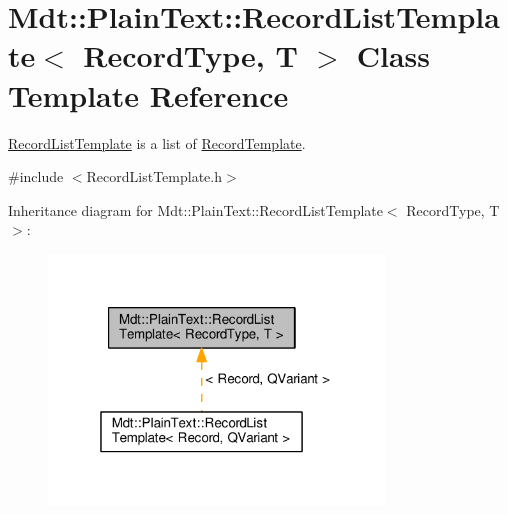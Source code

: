 \hypertarget{class_mdt_1_1_plain_text_1_1_record_list_template}{}\section{Mdt\+:\+:Plain\+Text\+:\+:Record\+List\+Template$<$ Record\+Type, T $>$ Class Template Reference}
\label{class_mdt_1_1_plain_text_1_1_record_list_template}


\hyperlink{class_mdt_1_1_plain_text_1_1_record_list_template}{Record\+List\+Template} is a list of \hyperlink{class_mdt_1_1_plain_text_1_1_record_template}{Record\+Template}.  




{\ttfamily \#include $<$Record\+List\+Template.\+h$>$}



Inheritance diagram for Mdt\+:\+:Plain\+Text\+:\+:Record\+List\+Template$<$ Record\+Type, T $>$\+:
\nopagebreak
\begin{figure}[H]
\begin{center}
\leavevmode
\includegraphics[width=253pt]{class_mdt_1_1_plain_text_1_1_record_list_template__inherit__graph}
\end{center}
\end{figure}

